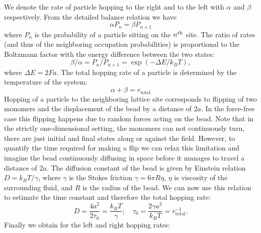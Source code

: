 \documentclass[aps,showpacs,twocolumn,floatfix,prx,superscriptaddress]{revtex4-1}
\begin{document}
 We denote the rate of particle hopping to the right and to the left with
$\alpha$ and $\beta$ respectively. From the detailed balance relation we have \begin{equation}
    \alpha P_{n} = \beta P_{n+1} \label{eq:db}
\end{equation}
where $P_{n}$ is the probability of a particle sitting
on the $n^{\rm{th}}$ site. The ratio of rates (and thus of the neighboring occupation probabilities)
is proportional to the Boltzmann
factor with the energy difference between the two states:
\begin{equation}
    \beta / \alpha = P_{n} / P_{n+1} = \exp{(-\Delta E / k_B T)},  \label{eq:r_divide_l}
\end{equation}
where  $\Delta E = 2Fa$.
The total hopping rate of a particle is determined by the temperature of the system:
\begin{equation}
    \alpha + \beta = r_{\text{total}} \label{eq:l_plus_r}
\end{equation}
 Hopping of a particle to the neighboring lattice site corresponds to flipping of two monomers and the displacement of the bead by a distance of $2a$. In the force-free case this flipping happens due to random forces acting on the bead. Note that in the strictly one-dimensional setting, the monomers can not continuously turn, there are just initial and final states along or against the field. However, to quantify the time required for making a flip we can relax this limitation and imagine the bead continuously diffusing in space before it manages to travel a distance of $2a$. The diffusion constant of the bead is given by Einstein relation $D=k_{B}T/\gamma$, where $\gamma$ is the Stokes friction $\gamma=6\pi R\eta$, $\eta$ is viscosity of the surrounding fluid, and $R$ is the radius of the bead. We can now use this relation to estimate the time constant and therefore the total hopping rate:
\begin{equation}
    \label{eq:timeScale}
D=\frac{4a^2}{2\tau_0}=\frac{k_{B}T}{\gamma}; \quad \tau_0=\frac{2\gamma a^2}{k_{B}T}=r_{\text{total}}^{-1}.
\end{equation}
Finally we obtain for the left and right hopping rates:
\end{document}
